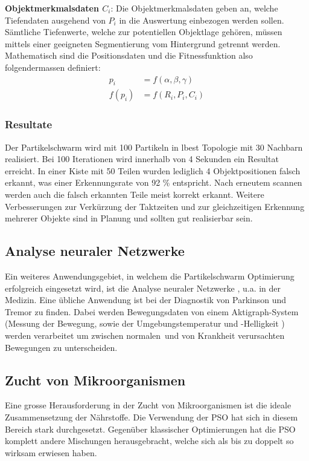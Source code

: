 \textbf{Objektmerkmalsdaten $C_i$}: Die Objektmerkmalsdaten geben an, welche Tiefendaten ausgehend von $P_i$ in die Auswertung einbezogen werden sollen. Sämtliche Tiefenwerte, welche zur potentiellen Objektlage gehören, müssen mittels einer geeigneten Segmentierung vom Hintergrund getrennt werden. \\

Mathematisch sind die Positionsdaten und die Fitnessfunktion also folgendermassen definiert: 
\begin{align}
	p_i &= f(\alpha ,\beta ,\gamma) \\
	f(p_i) &= f(R_i,P_i,C_i)
\end{align}

\subsubsection{Resultate}
Der Partikelschwarm wird mit 100 Partikeln in lbest Topologie mit 30 Nachbarn realisiert. Bei 100 Iterationen wird innerhalb von 4 Sekunden ein Resultat erreicht. In einer Kiste mit 50 Teilen wurden lediglich 4 Objektpositionen falsch erkannt, was einer Erkennungsrate von 92 \% entspricht. Nach erneutem scannen werden auch die falsch erkannten Teile meist korrekt erkannt. Weitere Verbesserungen zur Verkürzung der Taktzeiten und zur gleichzeitigen Erkennung  mehrerer Objekte sind in Planung und sollten gut realisierbar sein.

\subsection{Analyse neuraler Netzwerke}
Ein weiteres Anwendungsgebiet, in welchem die Partikelschwarm Optimierung erfolgreich eingesetzt wird, ist die Analyse neuraler Netzwerke , u.a. in der Medizin. Eine übliche Anwendung ist bei der Diagnostik von Parkinson und Tremor zu finden. Dabei werden Bewegungsdaten von einem Aktigraph-System (Messung der Bewegung, sowie der Umgebungstemperatur und -Helligkeit ) werden verarbeitet um zwischen \textacutedbl normalen\textacutedbl \ und von Krankheit verursachten Bewegungen zu unterscheiden. \cite{Shi-Appl}

\subsection{Zucht von Mikroorganismen}
Eine grosse Herausforderung in der Zucht von Mikroorganismen ist die ideale Zusammensetzung der Nährstoffe. Die Verwendung der PSO hat sich in diesem Bereich stark durchgesetzt. Gegenüber klassischer Optimierungen hat die PSO komplett andere Mischungen herausgebracht, welche sich als bis zu doppelt so wirksam erwiesen haben. \cite{Shi-Appl}